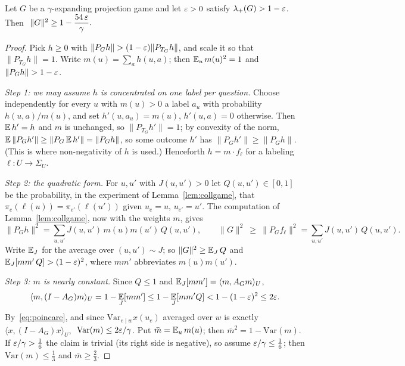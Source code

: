 \begin{theorem}\label{thm:expander}
Let $G$ be a $\gamma$-expanding projection game and let $\varepsilon>0$ satisfy $\lambda_{+}(G)>1-\varepsilon$.  Then $\ \|G\|^2\ge1-\dfrac{54\,\eps}{\gamma}.$
\end{theorem}
\begin{proof}
Pick $h\ge0$ with $\|P_Gh\|>(1-\eps)\|P_{T_G}h\|$, and scale it so that $\|P_{T_G}h\|=1$.  Write $m(u)=\sum_ah(u,a)$; then $\operatorname*{\mathbb{E}}_um(u)^2=1$ and $\|P_Gh\|>1-\eps$.

\emph{Step 1: we may assume $h$ is concentrated on one label per question.}  Choose independently for every $u$ with $m(u)>0$ a label $a_u$ with probability $h(u,a)/m(u)$, and set $h'(u,a_u)=m(u)$, $h'(u,a)=0$ otherwise.  Then $\operatorname*{\mathbb{E}} h'=h$ and $m$ is unchanged, so $\|P_{T_G}h'\|=1$; by convexity of the norm, $\operatorname*{\mathbb{E}}\|P_Gh'\|\ge\|P_G\operatorname*{\mathbb{E}} h'\|=\|P_Gh\|$, so some outcome $h'$ has $\|P_Gh'\|\ge\|P_Gh\|$.  (This is where non-negativity of $h$ is used.)
Henceforth $h=m\cdot f_\ell$ for a labeling $\ell\colon U\to\Sigma_U$.

\emph{Step 2: the quadratic form.}  For $u,u'$ with $J(u,u')>0$ let $Q(u,u')\in[0,1]$ be the probability, in the experiment of Lemma~\ref{lem:collgame}, that $\pi_e(\ell(u))=\pi_{e'}(\ell(u'))$ given $u_e=u$, $u_{e'}=u'$.  The computation of Lemma~\ref{lem:collgame}, now with the weights $m$, gives
\begin{equation}\label{eq:coll-quad}
  \|P_Gh\|^2=\sum_{u,u'}J(u,u')\,m(u)m(u')\,Q(u,u'),\qquad
  \|G\|^2\ \ge\ \|P_Gf_\ell\|^2=\sum_{u,u'}J(u,u')\,Q(u,u').
\end{equation}
Write $\operatorname*{\mathbb{E}}_J$ for the average over $(u,u')\sim J$; so $\|G\|^2\ge\operatorname*{\mathbb{E}}_JQ$ and $\operatorname*{\mathbb{E}}_J[mm'\,Q]>(1-\varepsilon)^2$, where $mm'$ abbreviates $m(u)m(u')$.

\emph{Step 3: $m$ is nearly constant.}  Since $Q\le1$ and $\operatorname*{\mathbb{E}}_J[mm']=\langle m,A_Gm\rangle_U$,
\[
  \langle m,(I-A_G)m\rangle_U=1-\operatorname*{\mathbb{E}}_J[mm']\le1-\operatorname*{\mathbb{E}}_J[mm'Q]<1-(1-\varepsilon)^2\le2\varepsilon .
\]
By~\eqref{eq:poincare}, and since $\mathrm{Var}_{e\mid w}x(u_e)$ averaged over $w$ is exactly $\langle x,(I-A_G)x\rangle_U$,
$\ \mathrm{Var}(m)\le2\varepsilon/\gamma$.  Put $\bar m=\operatorname*{\mathbb{E}}_um(u)$; then $\bar m^2=1-\mathrm{Var}(m)$.  If $\varepsilon/\gamma>\frac16$ the claim is trivial (its right side is negative), so assume $\varepsilon/\gamma\le\frac16$; then $\mathrm{Var}(m)\le\frac13$ and $\bar m\ge\frac23$.


\end{proof}
